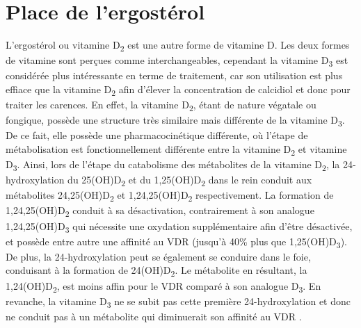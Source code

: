 \documentclass[
  a4paper,
  DIV=11,
  numbers=noendperiod,
  listof=totoc]{scrreprt}
\begin{document}
\hypertarget{place-de-lergostuxe9rol}{%
\section{Place de l'ergostérol}\label{place-de-lergostuxe9rol}}

L'ergostérol ou vitamine D\textsubscript{2} est une autre forme de
vitamine D. Les deux formes de vitamine sont perçues comme
interchangeables, cependant la vitamine D\textsubscript{3} est
considérée plus intéressante en terme de traitement, car son utilisation
est plus effiace que la vitamine D\textsubscript{2} afin d'élever la
concentration de calcidiol et donc pour traiter les carences. En effet,
la vitamine D\textsubscript{2}, étant de nature végatale ou fongique,
possède une structure très similaire mais différente de la vitamine
D\textsubscript{3}. De ce fait, elle possède une pharmacocinétique
différente, où l'étape de métabolisation est fonctionnellement
différente entre la vitamine D\textsubscript{2} et vitamine
D\textsubscript{3}. Ainsi, lors de l'étape du catabolisme des
métabolites de la vitamine D\textsubscript{2}, la 24-hydroxylation du
25(OH)D\textsubscript{2} et du 1,25(OH)D\textsubscript{2} dans le rein
conduit aux métabolites 24,25(OH)D\textsubscript{2} et
1,24,25(OH)D\textsubscript{2} respectivement. La formation de
1,24,25(OH)D\textsubscript{2} conduit à sa désactivation, contrairement
à son analogue 1,24,25(OH)D\textsubscript{3} qui nécessite une oxydation
supplémentaire afin d'être désactivée, et possède entre autre une
affinité au VDR (jusqu'à 40\% plus que 1,25(OH)D\textsubscript{3}). De
plus, la 24-hydroxylation peut se également se conduire dans le foie,
conduisant à la formation de 24(OH)D\textsubscript{2}. Le métabolite en
résultant, la 1,24(OH)D\textsubscript{2}, est moins affin pour le VDR
comparé à son analogue D\textsubscript{3}. En revanche, la vitamine
D\textsubscript{3} ne se subit pas cette première 24-hydroxylation et
donc ne conduit pas à un métabolite qui diminuerait son affinité au VDR
\autocite{Houghton.2006}.
\end{document}
